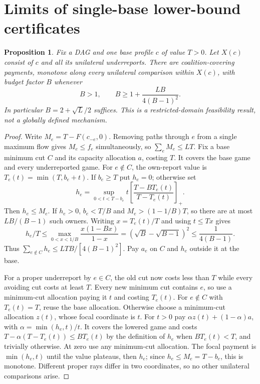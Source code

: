 \documentclass[11pt]{article}
\newtheorem{proposition}[theorem]{Proposition}
\theoremstyle{definition}\newtheorem{definition}[theorem]{Definition}
\theoremstyle{remark}\newtheorem{remark}[theorem]{Remark}
\begin{document}
\section{Limits of single-base lower-bound certificates}\label{noise:stars}
\begin{proposition}\label{noise:star-domain}
Fix a DAG and one base profile $c$ of value $T>0$. Let $X(c)$ consist of
$c$ and all its unilateral underreports. There are coalition-covering
payments, monotone along every unilateral comparison within $X(c)$, with
budget factor $B$ whenever
\[
 B>1,\qquad B\ge1+\frac{LB}{4(B-1)^2}.
\]
In particular $B=2+\sqrt L/2$ suffices. This is a restricted-domain
feasibility result, not a globally defined mechanism.
\end{proposition}
\begin{proof}
Write $M_e=T-F(c_{-e},0)$. Removing paths through $e$ from a single
maximum flow gives $M_e\le f_e$ simultaneously, so $\sum_eM_e\le LT$.
Fix a base minimum cut $C$ and its capacity allocation $a$, costing $T$.
It covers the base game and every underreported game.
For $e\notin C$, the own-report value is
$T_e(t)=\min(T,b_e+t)$. If $b_e\ge T$ put $h_e=0$; otherwise set
\[
 h_e=\sup_{0<t<T-b_e}
 t\left[\frac{T-BT_e(t)}{T-T_e(t)}\right]_+.
\]
Then $h_e\le M_e$. If $h_e>0$, $b_e<T/B$ and
$M_e>(1-1/B)T$, so there are at most $LB/(B-1)$ such owners.
Writing $x=T_e(t)/T$ and using $t\le Tx$ gives
\[
 h_e/T\le\max_{0<x<1/B}\frac{x(1-Bx)}{1-x}
 =(\sqrt B-\sqrt{B-1})^2\le\frac1{4(B-1)}.
\]
Thus $\sum_{e\notin C}h_e\le LTB/[4(B-1)^2]$.
Pay $a_e$ on $C$ and $h_e$ outside it at the base.

For a proper underreport by $e\in C$, the old cut now costs less than $T$
while every avoiding cut costs at least $T$. Every new minimum cut contains
$e$, so use a minimum-cut allocation paying it $t$ and costing $T_e(t)$.
For $e\notin C$ with $T_e(t)=T$, reuse the base allocation. Otherwise
choose a minimum-cut allocation $z(t)$, whose focal coordinate is $t$.
For $t>0$ pay $\alpha z(t)+(1-\alpha)a$, with
$\alpha=\min(h_e,t)/t$. It covers the lowered game and costs
$T-\alpha(T-T_e(t))\le BT_e(t)$ by the definition of $h_e$ when
$BT_e(t)<T$, and trivially otherwise. At zero use any minimum-cut allocation.
The focal payment is $\min(h_e,t)$ until the value plateaus, then $h_e$;
since $h_e\le M_e=T-b_e$, this is monotone. Different proper rays differ
in two coordinates, so no other unilateral comparisons arise.
\end{proof}
\end{document}
